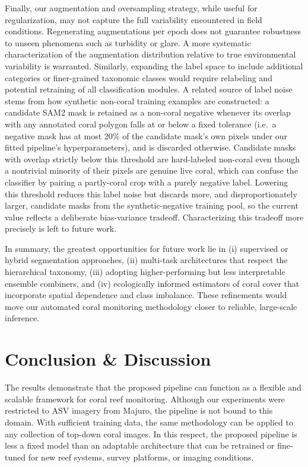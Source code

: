\documentclass[11pt]{elsarticle}
\begin{document}
Finally, our augmentation and oversampling strategy, while useful for regularization, may not capture the full variability encountered in field conditions. Regenerating augmentations per epoch does not guarantee robustness to unseen phenomena such as turbidity or glare. A more systematic characterization of the augmentation distribution relative to true environmental variability is warranted. Similarly, expanding the label space to include additional categories or finer-grained taxonomic classes would require relabeling and potential retraining of all classification modules. A related source of label noise stems from how synthetic non-coral training examples are constructed: a candidate SAM2 mask is retained as a non-coral negative whenever its overlap with any annotated coral polygon falls at or below a fixed tolerance (i.e.\ a negative mask has at most 20\% of the candidate mask's own pixels under our fitted pipeline's hyperparameters), and is discarded otherwise. Candidate masks with overlap strictly below this threshold are hard-labeled non-coral even though a nontrivial minority of their pixels are genuine live coral, which can confuse the classifier by pairing a partly-coral crop with a purely negative label. Lowering this threshold reduces this label noise but discards more, and disproportionately larger, candidate masks from the synthetic-negative training pool, so the current value reflects a deliberate bias-variance tradeoff. Characterizing this tradeoff more precisely is left to future work.

In summary, the greatest opportunities for future work lie in (i) supervised or hybrid segmentation approaches, (ii) multi-task architectures that respect the hierarchical taxonomy, (iii) adopting higher-performing but less interpretable ensemble combiners, and (iv) ecologically informed estimators of coral cover that incorporate spatial dependence and class imbalance. These refinements would move our automated coral monitoring methodology closer to reliable, large-scale inference.

\section{Conclusion \& Discussion}

The results demonstrate that the proposed pipeline can function as a flexible and scalable framework for coral reef monitoring. Although our experiments were restricted to ASV imagery from Majuro, the pipeline is not bound to this domain. With sufficient training data, the same methodology can be applied to any collection of top-down coral images. In this respect, the proposed pipeline is less a fixed model than an adaptable architecture that can be retrained or fine-tuned for new reef systems, survey platforms, or imaging conditions.
\end{document}
